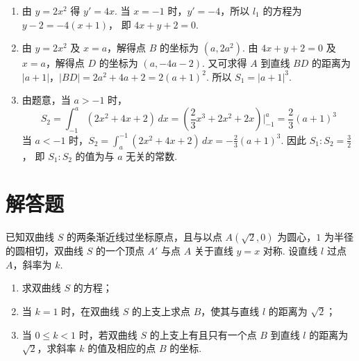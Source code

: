 \begin{solution}
\begin{enumerate}
\item 由 \(y=2x^{2}\) 得 \(y'=4x\). 当 \(x=-1\) 时，\(y'=-4\)，所以 \(l_{1}\) 的方程为 \(y-2=-4(x+1)\)，
即 \(4x+y+2=0\).

\item 由 \(y=2x^{2}\) 及 \(x=a\)，解得点 \(B\) 的坐标为 \((a,2a^{2})\).
由 \(4x+y+2=0\) 及 \(x=a\)，解得点 \(D\) 的坐标为 \((a,-4a-2)\).
又可求得 \(A\) 到直线 \(BD\) 的距离为 \(|a+1|\)，\(|BD|=2a^{2}+4a+2=2(a+1)^{2}\). 所以 \(S_{1}=|a+1|^{3}\).

\item 由题意，当 \(a>-1\) 时，
\[
S_{2}=\int_{-1}^{a}(2x^{2}+4x+2)\,dx
=\left(\frac{2}{3}x^{3}+2x^{2}+2x\right)\Big|_{-1}^{a}
=\frac{2}{3}(a+1)^{3}
\]
当 \(a<-1\) 时，\(S_{2}=\int_{a}^{-1}(2x^{2}+4x+2)\,dx=-\frac{2}{3}(a+1)^{3}\).
因此 \(S_{1}:S_{2}=\frac{3}{2}\)，
即 \(S_{1}:S_{2}\) 的值为与 \(a\) 无关的常数.
\end{enumerate}
\end{solution}

\section{解答题}

\begin{problem}
已知双曲线 \(S\) 的两条渐近线过坐标原点，且与以点 \(A(\sqrt{2},0)\) 为圆心，\(1\) 为半径的圆相切，双曲线 \(S\) 的一个顶点 \(A'\) 与点 \(A\) 关于直线 \(y=x\) 对称. 设直线 \(l\) 过点 \(A\)，斜率为 \(k\).

\begin{enumerate}
\item 求双曲线 \(S\) 的方程；
\item 当 \(k=1\) 时，在双曲线 \(S\) 的上支上求点 \(B\)，使其与直线 \(l\) 的距离为 \(\sqrt{2}\)；
\item 当 \(0 \leqslant k < 1\) 时，若双曲线 \(S\) 的上支上有且只有一个点 \(B\) 到直线 \(l\) 的距离为 \(\sqrt{2}\)，求斜率 \(k\) 的值及相应的点 \(B\) 的坐标.
\end{enumerate}

\end{problem}

